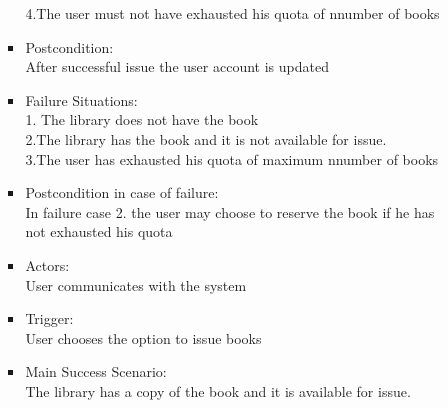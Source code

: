 \documentclass[a4paper]{article}
\begin{document}
\begin{enumerate}
\begin{itemize}
\begin{itemize}
	 4.The user must not have exhausted his quota of nnumber of books\\
 \item Postcondition:\\After successful issue the user account is updated\\
 \item Failure Situations:\\
 1. The library does not have  the book\\ 
 2.The library has the book and it is not available for issue.\\
 3.The user has exhausted his quota of maximum nnumber of books\\
 \item Postcondition in case of failure:\\In failure case 2. the user may choose to reserve the book if he has not exhausted his quota\\
 \item Actors:\\ User communicates with the system\\
 \item Trigger: \\User chooses the option to issue books\\
 \item Main Success Scenario:\\ The library has a copy of the book and it is available for issue.
	\end{itemize}
 


\end{itemize}
\end{enumerate}
\end{document}

